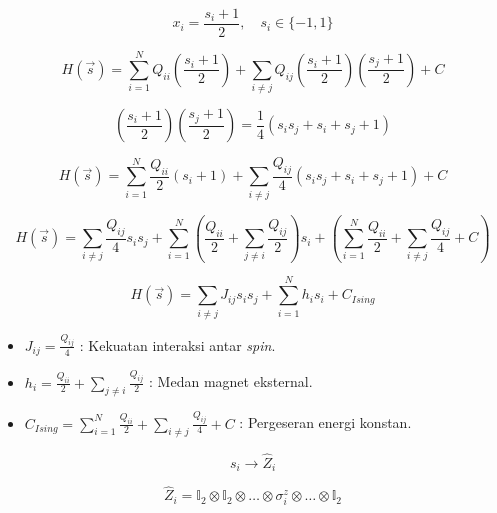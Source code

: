 \begin{equation}
    x_i = \frac{s_i + 1}{2}, \quad s_i \in \{-1, 1\}
\end{equation}

\begin{equation}
    H(\vec{s}) = \sum_{i=1}^N Q_{ii} \left( \frac{s_i + 1}{2} \right) + \sum_{i \ne j} Q_{ij} \left( \frac{s_i + 1}{2} \right) \left( \frac{s_j + 1}{2} \right) + C
\end{equation}

\begin{equation}
    \left( \frac{s_i + 1}{2} \right) \left( \frac{s_j + 1}{2} \right) = \frac{1}{4} (s_i s_j + s_i + s_j + 1)
\end{equation}

\begin{equation}
    H(\vec{s}) = \sum_{i=1}^N \frac{Q_{ii}}{2} (s_i + 1) + \sum_{i \ne j} \frac{Q_{ij}}{4} (s_i s_j + s_i + s_j + 1) + C
\end{equation}

\begin{equation}
    H(\vec{s}) = \sum_{i \ne j} \frac{Q_{ij}}{4} s_i s_j + \sum_{i=1}^N \left( \frac{Q_{ii}}{2} + \sum_{j \ne i} \frac{Q_{ij}}{2} \right) s_i + \left( \sum_{i=1}^N \frac{Q_{ii}}{2} + \sum_{i \ne j} \frac{Q_{ij}}{4} + C \right)
\end{equation}

\begin{equation}
    H(\vec{s}) = \sum_{i \ne j} J_{ij} s_i s_j + \sum_{i=1}^N h_i s_i + C_{Ising}
\end{equation}

\begin{itemize}
    \item $J_{ij} = \frac{Q_{ij}}{4}$ : Kekuatan interaksi antar \textit{spin}.
    \item $h_i = \frac{Q_{ii}}{2} + \sum_{j \ne i} \frac{Q_{ij}}{2}$ : Medan magnet eksternal.
    \item $C_{Ising} = \sum_{i=1}^N \frac{Q_{ii}}{2} + \sum_{i \ne j} \frac{Q_{ij}}{4} + C$ : Pergeseran energi konstan.
\end{itemize}

\begin{equation}
    s_i \to \hat{Z}_i
\end{equation}

\begin{equation}
    \hat{Z}_i = \mathbb{I}_2 \otimes \mathbb{I}_2 \otimes \dots \otimes \sigma^z_i \otimes \dots \otimes \mathbb{I}_2
\end{equation}

